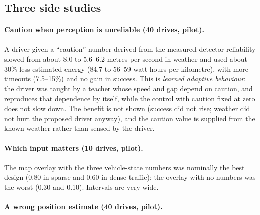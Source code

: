 \subsection{Three side studies}
\paragraph{Caution when perception is unreliable (40 drives, pilot).} A driver given a ``caution'' number derived from the measured detector reliability slowed from about 8.0 to 5.6--6.2 metres per second in weather and used about 30\% less estimated energy (84.7 to 56--59 watt-hours per kilometre), with more timeouts (7.5--15\%) and no gain in success. This is \emph{learned adaptive behaviour}: the driver was taught by a teacher whose speed and gap depend on caution, and reproduces that dependence by itself, while the control with caution fixed at zero does not slow down. The benefit is not shown (success did not rise; weather did not hurt the proposed driver anyway), and the caution value is supplied from the known weather rather than sensed by the driver.
\paragraph{Which input matters (10 drives, pilot).} The map overlay with the three vehicle-state numbers was nominally the best design (0.80 in sparse and 0.60 in dense traffic); the overlay with no numbers was the worst (0.30 and 0.10). Intervals are very wide.
\paragraph{A wrong position estimate (40 drives, pilot).}

